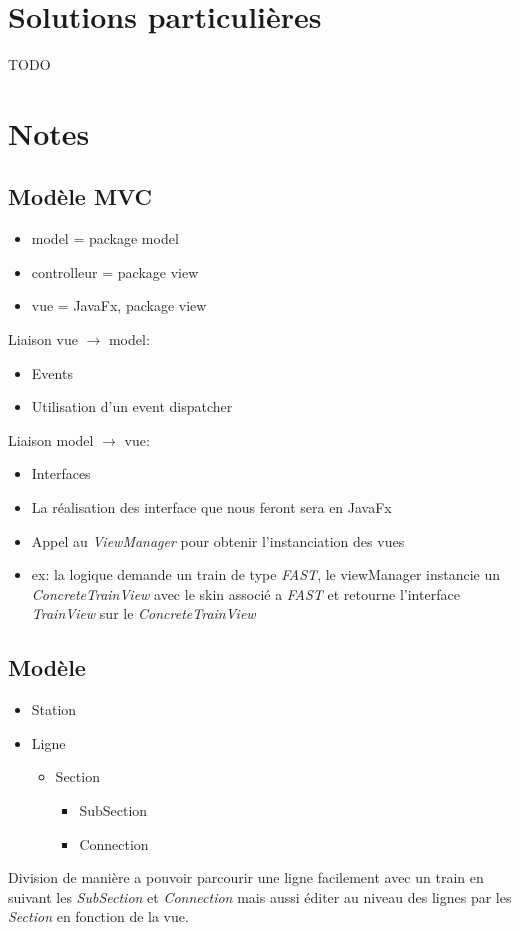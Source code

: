 \documentclass[report, backcover, french, nodocumentinfo]{upmethodology-document}
\begin{document}
	\chapter{Solutions particulières}
		TODO

	\chapter{Notes}
		\section{Modèle MVC}
			\begin{itemize}
				\item model = package model
				\item controlleur = package view
				\item vue = JavaFx, package view
			\end{itemize}
			Liaison vue $\rightarrow$ model:
			\begin{itemize}
				\item Events
				\item Utilisation d'un event dispatcher
			\end{itemize}
			Liaison model $\rightarrow$ vue:
			\begin{itemize}
				\item Interfaces
				\item La réalisation des interface que nous feront sera en JavaFx
				\item Appel au \textit{ViewManager} pour obtenir l'instanciation des vues
				\item ex: la logique demande un train de type \textit{FAST}, le viewManager instancie un \textit{ConcreteTrainView} avec le skin associé a \textit{FAST} et retourne l'interface \textit{TrainView} sur le \textit{ConcreteTrainView}
			\end{itemize}
		\section{Modèle}
			\begin{itemize}
				\item Station
				\item Ligne
					\begin{itemize}
						\item Section
							\begin{itemize}
								\item SubSection
								\item Connection
							\end{itemize}
					\end{itemize}
			\end{itemize}
			Division de manière a pouvoir parcourir une ligne facilement avec un train en suivant les \textit{SubSection} et \textit{Connection} mais aussi éditer au niveau des lignes par les \textit{Section} en fonction de la vue.
\end{document}
